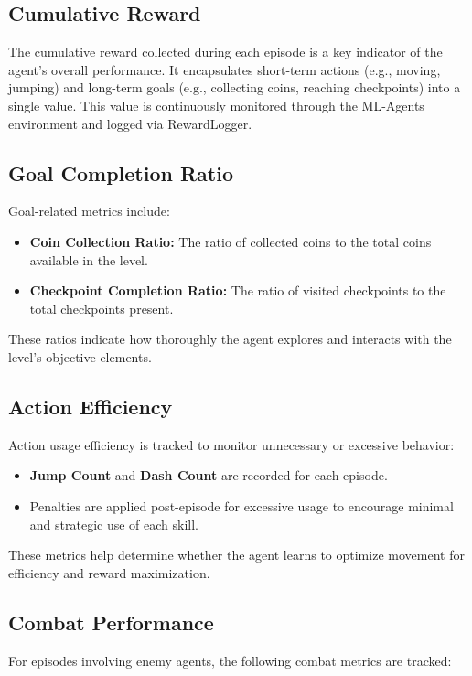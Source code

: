 \documentclass[12pt,oneside,openright,a4paper]{cpe-english-project}
\begin{document}
\subsection{Cumulative Reward}
The cumulative reward collected during each episode is a key indicator of the agent’s overall performance. It encapsulates short-term actions (e.g., moving, jumping) and long-term goals (e.g., collecting coins, reaching checkpoints) into a single value. This value is continuously monitored through the ML-Agents environment and logged via RewardLogger.

\subsection{Goal Completion Ratio}
Goal-related metrics include:

\begin{itemize}
\item \textbf{Coin Collection Ratio:} The ratio of collected coins to the total coins available in the level.
\item \textbf{Checkpoint Completion Ratio:} The ratio of visited checkpoints to the total checkpoints present.
\end{itemize}

These ratios indicate how thoroughly the agent explores and interacts with the level’s objective elements.

\subsection{Action Efficiency}
Action usage efficiency is tracked to monitor unnecessary or excessive behavior:

\begin{itemize}
\item \textbf{Jump Count} and \textbf{Dash Count} are recorded for each episode.
\item Penalties are applied post-episode for excessive usage to encourage minimal and strategic use of each skill.
\end{itemize}

These metrics help determine whether the agent learns to optimize movement for efficiency and reward maximization.

\subsection{Combat Performance}

For episodes involving enemy agents, the following combat metrics are tracked:
\end{document}
